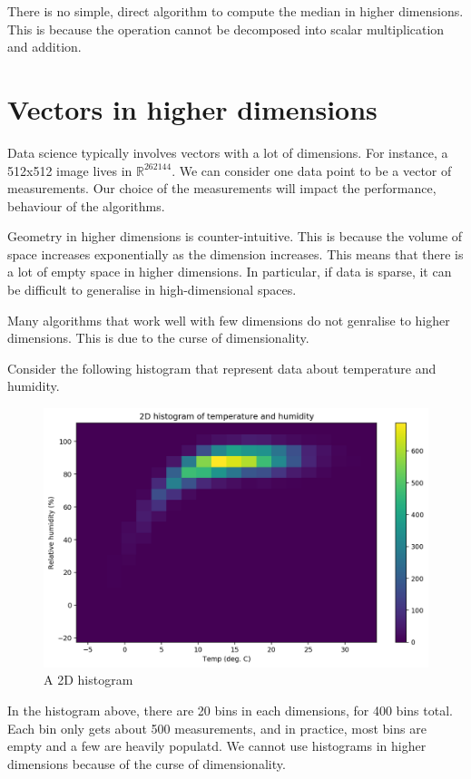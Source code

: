 \documentclass[a4paper, openany]{memoir}
\begin{document}
    There is no simple, direct algorithm to compute the median in higher dimensions. This is because the operation cannot be decomposed into scalar multiplication and addition.

    \section{Vectors in higher dimensions}
    Data science typically involves vectors with a lot of dimensions. For instance, a 512x512 image lives in $\mathbb{R}^{262 144}$. We can consider one data point to be a vector of measurements. Our choice of the measurements will impact the performance, behaviour of the algorithms.

    Geometry in higher dimensions is counter-intuitive. This is because the volume of space increases exponentially as the dimension increases. This means that there is a lot of empty space in higher dimensions. In particular, if data is sparse, it can be difficult to generalise in high-dimensional spaces.

    Many algorithms that work well with few dimensions do not genralise to higher dimensions. This is due to the curse of dimensionality.

    Consider the following histogram that represent data about temperature and humidity.
    \begin{figure}[H]
        \centering
        \includegraphics[scale=0.5]{src/3.5 2DHistogram.png}
        \caption{A 2D histogram}
    \end{figure}
    \noindent In the histogram above, there are 20 bins in each dimensions, for 400 bins total. Each bin only gets about 500 measurements, and in practice, most bins are empty and a few are heavily populatd. We cannot use histograms in higher dimensions because of the curse of dimensionality.
\end{document}
